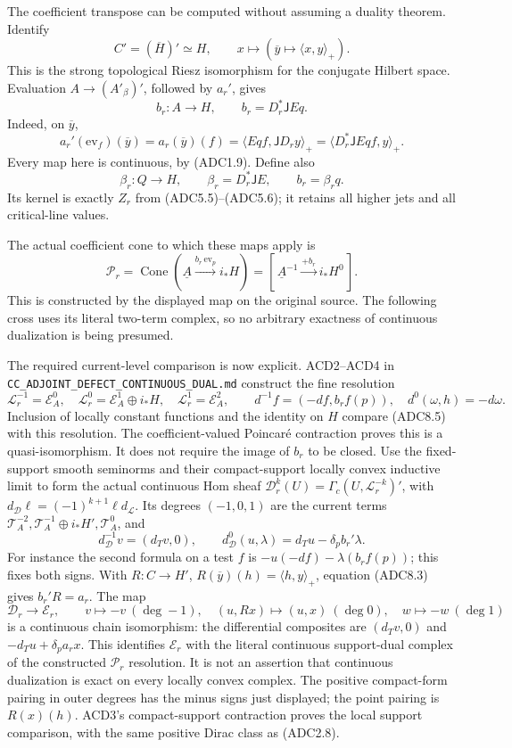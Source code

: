The coefficient transpose can be computed without assuming a duality
theorem. Identify \[
C'=(\overline H)'\simeq H,\qquad
x\longmapsto(\overline y\longmapsto\langle x,y\rangle_+).
\tag{ADC8.1}
\] This is the strong topological Riesz isomorphism for the conjugate
Hilbert space. Evaluation \(A\to(A'_\beta)'\), followed by \(a_r'\),
gives \[
b_r:A\longrightarrow H,\qquad
b_r=D_r^*\mathsf J E q.
\tag{ADC8.2}
\] Indeed, on \(\overline y\), \[
a_r'(\mathrm{ev}_f)(\overline y)
=a_r(\overline y)(f)
=\langle E qf,\mathsf JD_ry\rangle_+
=\langle D_r^*\mathsf JE qf,y\rangle_+.
\tag{ADC8.3}
\] Every map here is continuous, by (ADC1.9). Define also \[
\beta_r:Q\to H,\qquad \beta_r=D_r^*\mathsf JE,\qquad
b_r=\beta_rq.
\tag{ADC8.4}
\] Its kernel is exactly \(Z_r\) from (ADC5.5)--(ADC5.6); it retains all
higher jets and all critical-line values.

The actual coefficient cone to which these maps apply is \[
\mathscr P_r=\operatorname{Cone}
(\underline A\xrightarrow{b_r\,\mathrm{ev}_p}i_*H)
=[\,\underline A^{-1}\xrightarrow{+b_r}i_*H^0\,].
\tag{ADC8.5}
\] This is constructed by the displayed map on the original source. The
following cross uses its literal two-term complex, so no arbitrary
exactness of continuous dualization is being presumed.

The required current-level comparison is now explicit. ACD2--ACD4 in
\nolinkurl{CC_ADJOINT_DEFECT_CONTINUOUS_DUAL.md} construct the fine
resolution \[
\mathscr L_r^{-1}=\mathscr E_A^0,\quad
\mathscr L_r^0=\mathscr E_A^1\oplus i_*H,\quad
\mathscr L_r^1=\mathscr E_A^2,\qquad
d^{-1}f=(-df,b_rf(p)),\quad d^0(\omega,h)=-d\omega.
\tag{ADC8.5a}
\] Inclusion of locally constant functions and the identity on \(H\)
compare (ADC8.5) with this resolution. The coefficient-valued Poincaré
contraction proves this is a quasi-isomorphism. It does not require the
image of \(b_r\) to be closed. Use the fixed-support smooth seminorms
and their compact-support locally convex inductive limit to form the
actual continuous Hom sheaf
\(\mathscr D_r^k(U)=\Gamma_c(U,\mathscr L_r^{-k})'\), with
\(d_{\mathscr D}\ell=(-1)^{k+1}\ell d_{\mathscr L}\). Its degrees
\((-1,0,1)\) are the current terms
\(\mathscr T_A^{-2},\mathscr T_A^{-1}\oplus i_*H',\mathscr T_A^0\), and
\[
d_{\mathscr D}^{-1}v=(d_Tv,0),\qquad
d_{\mathscr D}^{0}(u,\lambda)=d_Tu-\delta_pb_r'\lambda.
\tag{ADC8.5b}
\] For instance the second formula on a test \(f\) is
\(-u(-df)-\lambda(b_rf(p))\); this fixes both signs. With \(R:C\to H'\),
\(R(\overline y)(h)=\langle h,y\rangle_+\), equation (ADC8.3) gives
\(b_r'R=a_r\). The map \[
\mathscr D_r\longrightarrow\mathscr E_r,\qquad
v\mapsto-v\ (\deg-1),\quad
(u,Rx)\mapsto(u,x)\ (\deg0),\quad
w\mapsto-w\ (\deg1)
\tag{ADC8.5c}
\] is a continuous chain isomorphism: the differential composites are
\((d_Tv,0)\) and \(-d_Tu+\delta_pa_rx\). This identifies
\(\mathscr E_r\) with the literal continuous support-dual complex of the
constructed \(\mathscr P_r\) resolution. It is not an assertion that
continuous dualization is exact on every locally convex complex. The
positive compact-form pairing in outer degrees has the minus signs just
displayed; the point pairing is \(R(x)(h)\). ACD3's compact-support
contraction proves the local support comparison, with the same positive
Dirac class as (ADC2.8).

